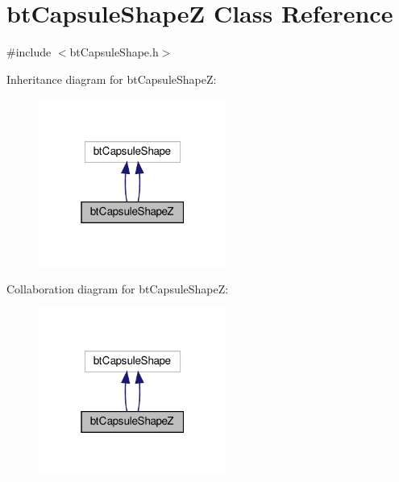 \hypertarget{classbtCapsuleShapeZ}{}\section{bt\+Capsule\+ShapeZ Class Reference}
\label{classbtCapsuleShapeZ}


{\ttfamily \#include $<$bt\+Capsule\+Shape.\+h$>$}



Inheritance diagram for bt\+Capsule\+ShapeZ\+:
\nopagebreak
\begin{figure}[H]
\begin{center}
\leavevmode
\includegraphics[width=175pt]{classbtCapsuleShapeZ__inherit__graph}
\end{center}
\end{figure}


Collaboration diagram for bt\+Capsule\+ShapeZ\+:
\nopagebreak
\begin{figure}[H]
\begin{center}
\leavevmode
\includegraphics[width=175pt]{classbtCapsuleShapeZ__coll__graph}
\end{center}
\end{figure}

